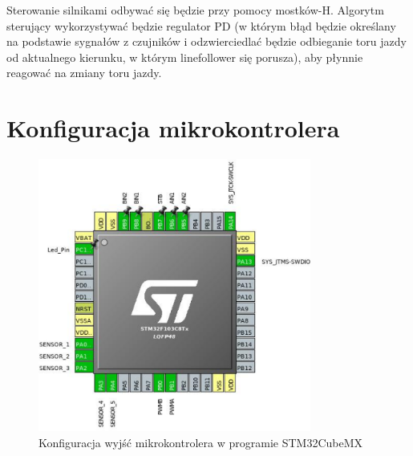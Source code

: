 \documentclass[10pt, a4paper]{article}
\begin{document}
Sterowanie silnikami odbywać się będzie przy pomocy mostków-H. Algorytm sterujący wykorzystywać będzie regulator PD (w którym błąd będzie określany na podstawie sygnałów z czujników i odzwierciedlać będzie odbieganie toru jazdy od aktualnego kierunku, w którym linefollower się porusza), aby płynnie reagować na zmiany toru jazdy.



 
\section{Konfiguracja mikrokontrolera}

\begin{figure}[H]
	\centering
	\includegraphics[width=0.8\textwidth]{konfiguracja_mcu.png}
	\caption{Konfiguracja wyjść mikrokontrolera w programie STM32CubeMX}
	\label{fig:KonfiguracjaMikrokontrolera}
\end{figure}
\end{document}
